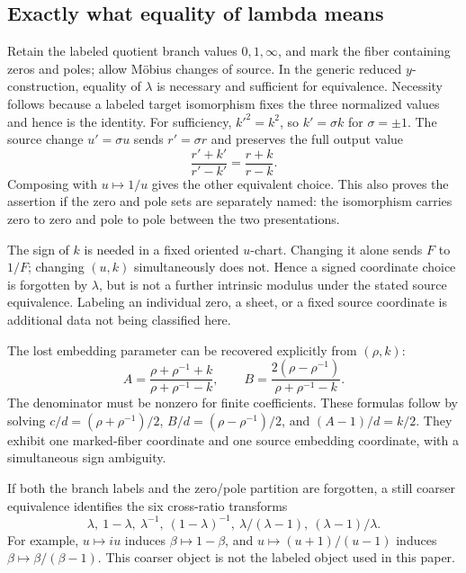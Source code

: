 
\subsection{Exactly what equality of lambda means}
Retain the labeled quotient branch values \(0,1,\infty\), and mark the fiber containing zeros and poles; allow Möbius changes of source. In the generic reduced \(y\)-construction, equality of \(\lambda\) is necessary and sufficient for equivalence. Necessity follows because a labeled target isomorphism fixes the three normalized values and hence is the identity. For sufficiency, \(k'^2=k^2\), so \(k'=\sigma k\) for \(\sigma=\pm1\). The source change \(u'=\sigma u\) sends \(r'=\sigma r\) and preserves the full output value
\[
\frac{r'+k'}{r'-k'}=\frac{r+k}{r-k}.
\]
Composing with \(u\mapsto1/u\) gives the other equivalent choice. This also proves the assertion if the zero and pole sets are separately named: the isomorphism carries zero to zero and pole to pole between the two presentations.

The sign of \(k\) is needed in a fixed oriented \(u\)-chart. Changing it alone sends \(F\) to \(1/F\); changing \((u,k)\) simultaneously does not. Hence a signed coordinate choice is forgotten by \(\lambda\), but is not a further intrinsic modulus under the stated source equivalence. Labeling an individual zero, a sheet, or a fixed source coordinate is additional data not being classified here.

The lost embedding parameter can be recovered explicitly from \((\rho,k)\):
\begin{equation}\label{eq:recover}
A=\frac{\rho+\rho^{-1}+k}{\rho+\rho^{-1}-k},\qquad
B=\frac{2(\rho-\rho^{-1})}{\rho+\rho^{-1}-k}.
\end{equation}
The denominator must be nonzero for finite coefficients. These formulas follow by solving \(c/d=(\rho+\rho^{-1})/2\), \(B/d=(\rho-\rho^{-1})/2\), and \((A-1)/d=k/2\). They exhibit one marked-fiber coordinate and one source embedding coordinate, with a simultaneous sign ambiguity.

If both the branch labels and the zero/pole partition are forgotten, a still coarser equivalence identifies the six cross-ratio transforms
\[
\lambda,\ 1-\lambda,\ \lambda^{-1},\ (1-\lambda)^{-1},\
\lambda/(\lambda-1),\ (\lambda-1)/\lambda.
\]
For example, \(u\mapsto iu\) induces \(\beta\mapsto1-\beta\), and \(u\mapsto(u+1)/(u-1)\) induces \(\beta\mapsto\beta/(\beta-1)\). This coarser object is not the labeled object used in this paper.

